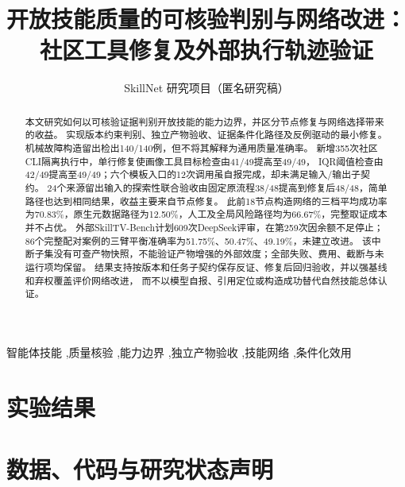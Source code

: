 \documentclass[a4paper,fleqn]{cas-dc}
\begin{document}
\let\WriteBookmarks\relax
\def\floatpagepagefraction{1}
\def\textpagefraction{.01}
\title[mode=title]{开放技能质量的可核验判别与网络改进：\texorpdfstring{\\}{ }社区工具修复及外部执行轨迹验证}
\author{SkillNet 研究项目（匿名研究稿）}
\begin{abstract}
本文研究如何以可核验证据判别开放技能的能力边界，并区分节点修复与网络选择带来的收益。
实现版本约束判别、独立产物验收、证据条件化路径及反例驱动的最小修复。
机械故障构造留出检出140/140例，但不将其解释为通用质量准确率。
新增355次社区CLI隔离执行中，单行修复使画像工具目标检查由41/49提高至49/49，
IQR阈值检查由42/49提高至49/49；六个模板入口的12次调用虽自报完成，却未满足输入/输出子契约。
24个来源留出输入的探索性联合验收由固定原流程38/48提高到修复后48/48，简单路径也达到相同结果，收益主要来自节点修复。
此前18节点构造网络的三档平均成功率为70.83\%，原生元数据路径为12.50\%，人工及全局风险路径均为66.67\%，完整取证成本并不占优。
外部SkillTV-Bench计划609次DeepSeek评审，在第259次因余额不足停止；86个完整配对案例的三臂平衡准确率为51.75\%、50.47\%、49.19\%，未建立改进。
该中断子集没有可查产物快照，不能验证产物增强的外部效度；全部失败、费用、截断与未运行项均保留。
结果支持按版本和任务子契约保存反证、修复后回归验收，并以强基线和弃权覆盖评价网络改进，
而不以模型自报、引用定位或构造成功替代自然技能总体认证。
\end{abstract}
\begin{keywords}
智能体技能 \sep 质量核验 \sep 能力边界 \sep 独立产物验收 \sep 技能网络 \sep 条件化效用
\end{keywords}
\maketitle
\gdef\lastpage{\pageref*{LastPage}}









\section{实验结果}





\section*{数据、代码与研究状态声明}



\clearpage
\appendix

\end{document}
